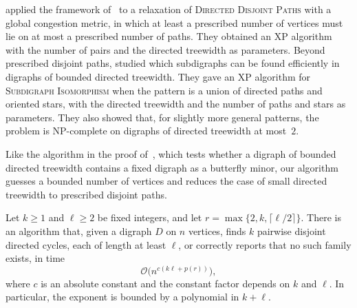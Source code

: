 \documentclass[fontsize=12pt,leading=14pt]{fullpaper}
\begin{document}
\textcite{LS22} applied the framework of~\cite{Johnson2001} to a relaxation of \textsc{Directed Disjoint Paths} with a global congestion metric, in which at least a prescribed number of vertices must lie on at most a prescribed number of paths.
They obtained an XP algorithm with the number of pairs and the directed treewidth as parameters.
Beyond prescribed disjoint paths, \textcite{LS25} studied which subdigraphs can be found efficiently in digraphs of bounded directed treewidth.
They gave an XP algorithm for \textsc{Subdigraph Isomorphism} when the pattern is a union of directed paths and oriented stars, with the directed treewidth and the number of paths and stars as parameters.
They also showed that, for slightly more general patterns, the problem is NP-complete on digraphs of directed treewidth at most~$2$.

Like the algorithm in the proof of~\cite[Theorem~3.8]{AKKW16}, which tests whether a digraph of bounded directed treewidth contains a fixed digraph as a butterfly minor, our algorithm guesses a bounded number of vertices and reduces the case of small directed treewidth to prescribed disjoint paths.

\begin{theorem}\label{thm:long-cycle-algorithm}
  Let $k\ge1$ and $\ell\ge2$ be fixed integers, and let $r=\max\{2,k,\lceil\ell/2\rceil\}$.
  There is an algorithm that, given a digraph $D$ on $n$ vertices, finds $k$ pairwise disjoint directed cycles, each of length at least $\ell$, or correctly reports that no such family exists, in time
  \[
    \mathcal{O}\bigl(n^{c(k\ell+p(r))}\bigr),
  \]
  where $c$ is an absolute constant and the constant factor depends on $k$ and $\ell$.
  In particular, the exponent is bounded by a polynomial in $k+\ell$.
\end{theorem}
\end{document}
